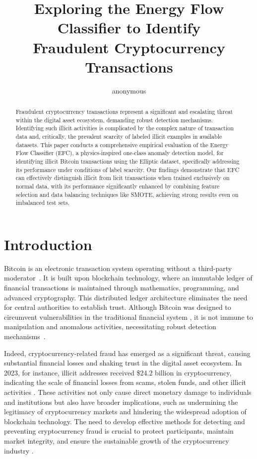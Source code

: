 \documentclass[12pt]{article}
\title{Exploring the Energy Flow Classifier to Identify \\ Fraudulent Cryptocurrency Transactions}
\author{anonymous}
\begin{document}
 

\maketitle

\begin{abstract}
  Fraudulent cryptocurrency transactions represent a significant and escalating threat within the digital asset ecosystem,
  demanding robust detection mechanisms. Identifying such illicit activities is complicated by the complex nature of transaction
  data and, critically, the prevalent scarcity of labeled illicit examples in available datasets. This paper conducts a
  comprehensive empirical evaluation of the Energy Flow Classifier (EFC), a physics-inspired one-class anomaly detection
  model, for identifying illicit Bitcoin transactions using the Elliptic dataset, specifically addressing its performance
  under conditions of label scarcity. Our findings demonstrate that EFC can effectively distinguish illicit from licit
  transactions when trained exclusively on normal data, with its performance significantly enhanced by combining feature
  selection and data balancing techniques like SMOTE, achieving strong results even on imbalanced test sets.
\end{abstract}

\section{Introduction} \label{sec:introduction}
Bitcoin is an electronic transaction system operating without a third-party moderator~\cite{nakamoto2008bitcoin}. It is built
upon blockchain technology, where an immutable ledger of financial transactions is maintained through mathematics, programming,
and advanced cryptography. This distributed ledger architecture eliminates the need for central authorities to establish trust.
Although Bitcoin was designed to circumvent vulnerabilities in the traditional financial system \cite{nakamoto2008bitcoin},
it is not immune to manipulation and anomalous activities, necessitating robust detection mechanisms~\cite{fang2022cryptocurrency,
zhang2020financial,zainal2018review}. 

Indeed, cryptocurrency-related fraud has emerged as a significant threat, causing substantial financial losses and shaking
trust in the digital asset ecosystem. In 2023, for instance, illicit addresses received \$24.2 billion in cryptocurrency,
indicating the scale of financial losses from scams, stolen funds, and other illicit activities \cite{chainalysis2024cryptocrime}.
These activities not only cause direct monetary damage to individuals and institutions but also have broader implications,
such as undermining the legitimacy of cryptocurrency markets and hindering the widespread adoption of blockchain technology.
The need to develop effective methods for detecting and preventing cryptocurrency fraud is crucial to protect participants,
maintain market integrity, and ensure the sustainable growth of the cryptocurrency industry \cite{scharfman2024, Khiari2025}.
\end{document}
